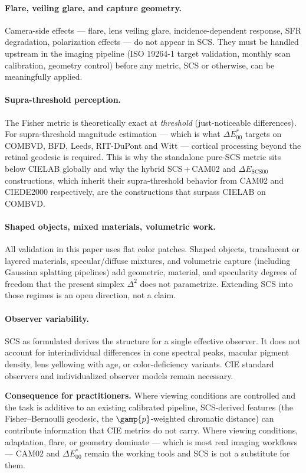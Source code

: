 \documentclass[12pt,a4paper]{article}
\begin{document}
\paragraph{Flare, veiling glare, and capture geometry.}
Camera-side effects --- flare, lens veiling glare, incidence-dependent
response, SFR degradation, polarization effects --- do not appear in
SCS. They must be handled upstream in the imaging pipeline (ISO
19264-1 target validation, monthly scan calibration, geometry control)
before any metric, SCS or otherwise, can be meaningfully applied.

\paragraph{Supra-threshold perception.}
The Fisher metric is theoretically exact at \emph{threshold}
(just-noticeable differences). For supra-threshold magnitude estimation
--- which is what $\Delta E^*_{00}$ targets on COMBVD, BFD, Leeds,
RIT-DuPont and Witt --- cortical processing beyond the retinal geodesic
is required. This is why the standalone pure-SCS metric sits below
CIELAB globally and why the hybrid SCS\,+\,CAM02 and
$\Delta E_{\mathrm{SCS00}}$ constructions, which inherit their
supra-threshold behavior from CAM02 and CIEDE2000 respectively, are the
constructions that surpass CIELAB on COMBVD.

\paragraph{Shaped objects, mixed materials, volumetric work.}
All validation in this paper uses flat color patches. Shaped objects,
translucent or layered materials, specular/diffuse mixtures, and
volumetric capture (including Gaussian splatting pipelines) add
geometric, material, and specularity degrees of freedom that the
present simplex $\Delta^2$ does not parametrize. Extending SCS into
those regimes is an open direction, not a claim.

\paragraph{Observer variability.}
SCS as formulated derives the structure for a single effective
observer. It does not account for interindividual differences
in cone spectral peaks, macular pigment density, lens yellowing with
age, or color-deficiency variants. CIE standard observers and
individualized observer models remain necessary.

\medskip\noindent\textbf{Consequence for practitioners.} Where viewing
conditions are controlled and the task is additive to an existing
calibrated pipeline, SCS-derived features (the Fisher--Bernoulli
geodesic, the $\gamp{p}$-weighted chromatic distance) can contribute
information that CIE metrics do not carry. Where viewing conditions,
adaptation, flare, or geometry dominate --- which is most real imaging
workflows --- CAM02 and $\Delta E^*_{00}$ remain the working tools and
SCS is not a substitute for them.
\end{document}
